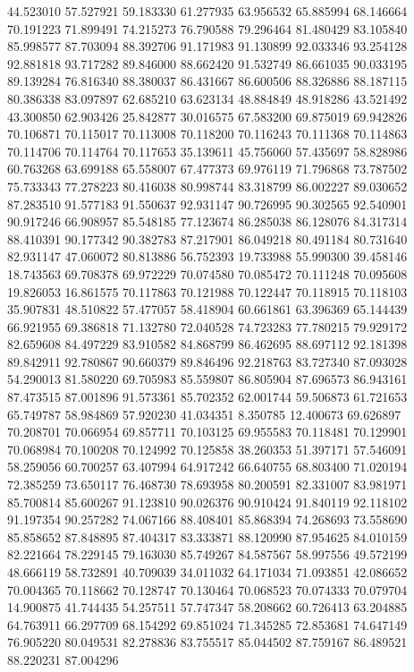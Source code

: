 44.523010
57.527921
59.183330
61.277935
63.956532
65.885994
68.146664
70.191223
71.899491
74.215273
76.790588
79.296464
81.480429
83.105840
85.998577
87.703094
88.392706
91.171983
91.130899
92.033346
93.254128
92.881818
93.717282
89.846000
88.662420
91.532749
86.661035
90.033195
89.139284
76.816340
88.380037
86.431667
86.600506
88.326886
88.187115
80.386338
83.097897
62.685210
63.623134
48.884849
48.918286
43.521492
43.300850
62.903426
25.842877
30.016575
67.583200
69.875019
69.942826
70.106871
70.115017
70.113008
70.118200
70.116243
70.111368
70.114863
70.114706
70.114764
70.117653
35.139611
45.756060
57.435697
58.828986
60.763268
63.699188
65.558007
67.477373
69.976119
71.796868
73.787502
75.733343
77.278223
80.416038
80.998744
83.318799
86.002227
89.030652
87.283510
91.577183
91.550637
92.931147
90.726995
90.302565
92.540901
90.917246
66.908957
85.548185
77.123674
86.285038
86.128076
84.317314
88.410391
90.177342
90.382783
87.217901
86.049218
80.491184
80.731640
82.931147
47.060072
80.813886
56.752393
19.733988
55.990300
39.458146
18.743563
69.708378
69.972229
70.074580
70.085472
70.111248
70.095608
19.826053
16.861575
70.117863
70.121988
70.122447
70.118915
70.118103
35.907831
48.510822
57.477057
58.418904
60.661861
63.396369
65.144439
66.921955
69.386818
71.132780
72.040528
74.723283
77.780215
79.929172
82.659608
84.497229
83.910582
84.868799
86.462695
88.697112
92.181398
89.842911
92.780867
90.660379
89.846496
92.218763
83.727340
87.093028
54.290013
81.580220
69.705983
85.559807
86.805904
87.696573
86.943161
87.473515
87.001896
91.573361
85.702352
62.001744
59.506873
61.721653
65.749787
58.984869
57.920230
41.034351
8.350785
12.400673
69.626897
70.208701
70.066954
69.857711
70.103125
69.955583
70.118481
70.129901
70.068984
70.100208
70.124992
70.125858
38.260353
51.397171
57.546091
58.259056
60.700257
63.407994
64.917242
66.640755
68.803400
71.020194
72.385259
73.650117
76.468730
78.693958
80.200591
82.331007
83.981971
85.700814
85.600267
91.123810
90.026376
90.910424
91.840119
92.118102
91.197354
90.257282
74.067166
88.408401
85.868394
74.268693
73.558690
85.858652
87.848895
87.404317
83.333871
88.120990
87.954625
84.010159
82.221664
78.229145
79.163030
85.749267
84.587567
58.997556
49.572199
48.666119
58.732891
40.709039
34.011032
64.171034
71.093851
42.086652
70.004365
70.118662
70.128747
70.130464
70.068523
70.074333
70.079704
14.900875
41.744435
54.257511
57.747347
58.208662
60.726413
63.204885
64.763911
66.297709
68.154292
69.851024
71.345285
72.853681
74.647149
76.905220
80.049531
82.278836
83.755517
85.044502
87.759167
86.489521
88.220231
87.004296
